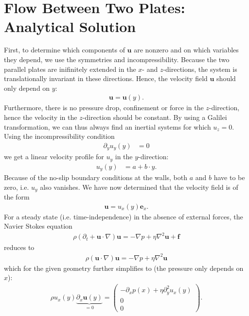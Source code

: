 \documentclass[a4paper,10pt,bibtotoc]{scrartcl}
\begin{document}
\section{Flow Between Two Plates: Analytical Solution}
First, to determine which components of $\mathbf{u}$ are nonzero and on which variables they depend, we use the symmetries and incompressibility. Because the two parallel plates are inifinitely extended in the $x$- and $z$-directions, the system is translationally invariant in these directions. Hence, the velocity field $\mathbf{u}$ should only depend on $y$:
\begin{align*}
\mathbf{u} = \mathbf{u}(y).
\end{align*}
Furthermore, there is no pressure drop, confinement or force in the $z$-direction, hence the velocity in the $z$-direction should be constant. By using a Galilei transformation, we can thus always find an inertial systems for which $u_z=0$. Using the incompressibility condition 
\begin{align}
 \partial_y u_y(y) &= 0
\end{align}
we get a linear velocity profile for $u_y$ in the $y$-direction:
\begin{align}
u_y(y) &= a + b \cdot y.
\end{align}
Because of the no-slip boundary conditions at the walls, both $a$ and $b$ have to be zero, i.e. $u_y$ also vanishes. We have now determined that the velocity field is of the form
\begin{align}
 \mathbf{u} = u_x(y)\mathbf{e}_x.
\end{align}
For a steady state (i.e. time-independence) in the absence of external forces, the Navier Stokes equation
\begin{align}
 \rho\left(\partial_t + \mathbf{u}\cdot \nabla\right)\mathbf{u} = -\nabla p + \eta \nabla ^2 \mathbf{u} + \mathbf{f}
\end{align} reduces to 
\begin{align}
 \rho \left(\mathbf{u}\cdot \nabla\right)\mathbf{u} = -\nabla p + \eta \nabla ^2 \mathbf{u}
\end{align}
which for the given geometry further simplifies to (the pressure only depends on $x$):
\begin{align}
 \rho u_x(y)\underbrace{\partial_x \mathbf{u}(y)}_{=0} = \begin{pmatrix} -\partial_x p(x) + \eta\partial_y^2 u_x(y)\\ 0 \\ 0 \end{pmatrix}.
\end{align}
\end{document}
